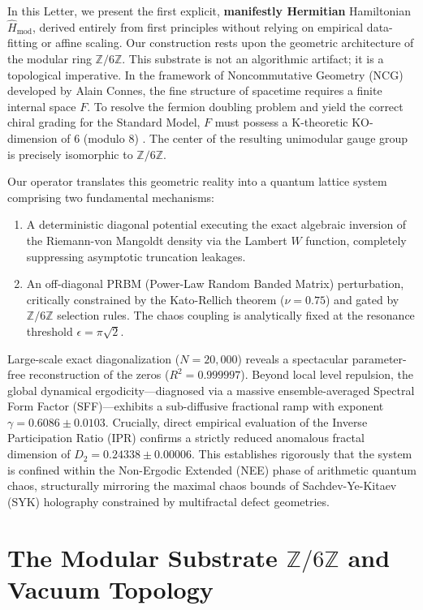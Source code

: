 \documentclass[aps,prl,preprint,superscriptaddress,floatfix]{revtex4-2}
\newcommand{\Zmod}{\mathbb{Z}/6\mathbb{Z}}
\begin{document}
In this Letter, we present the first explicit, \textbf{manifestly Hermitian} Hamiltonian $\hat{H}_{\text{mod}}$, derived entirely from first principles without relying on empirical data-fitting or affine scaling. Our construction rests upon the geometric architecture of the modular ring $\mathbb{Z}/6\mathbb{Z}$. This substrate is not an algorithmic artifact; it is a topological imperative. In the framework of Noncommutative Geometry (NCG) developed by Alain Connes, the fine structure of spacetime requires a finite internal space $F$. To resolve the fermion doubling problem and yield the correct chiral grading for the Standard Model, $F$ must possess a K-theoretic KO-dimension of 6 (modulo 8) \cite{Connes2008, Chamseddine2007, ConnesConsani2021}. The center of the resulting unimodular gauge group is precisely isomorphic to $\Zmod$.

Our operator translates this geometric reality into a quantum lattice system comprising two fundamental mechanisms:
\begin{enumerate}
    \item A deterministic diagonal potential executing the exact algebraic inversion of the Riemann-von Mangoldt density via the Lambert $W$ function, completely suppressing asymptotic truncation leakages.
    \item An off-diagonal PRBM (Power-Law Random Banded Matrix) perturbation, critically constrained by the Kato-Rellich theorem ($\nu = 0.75$) and gated by $\Zmod$ selection rules. The chaos coupling is analytically fixed at the resonance threshold $\epsilon = \pi\sqrt{2}$.
\end{enumerate}

Large-scale exact diagonalization ($N=20,000$) reveals a spectacular parameter-free reconstruction of the zeros ($R^2 = 0.999997$). Beyond local level repulsion, the global dynamical ergodicity—diagnosed via a massive ensemble-averaged Spectral Form Factor (SFF)—exhibits a sub-diffusive fractional ramp with exponent $\gamma = 0.6086 \pm 0.0103$. Crucially, direct empirical evaluation of the Inverse Participation Ratio (IPR) confirms a strictly reduced anomalous fractal dimension of $D_2 = 0.24338 \pm 0.00006$. This establishes rigorously that the system is confined within the Non-Ergodic Extended (NEE) phase of arithmetic quantum chaos, structurally mirroring the maximal chaos bounds of Sachdev-Ye-Kitaev (SYK) holography constrained by multifractal defect geometries.

\section{The Modular Substrate \texorpdfstring{$\mathbb{Z}/6\mathbb{Z}$}{Z/6Z} and Vacuum Topology}
\end{document}
